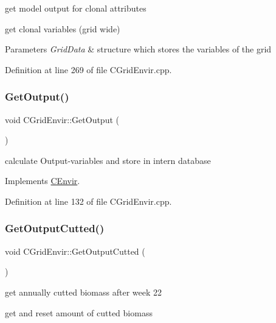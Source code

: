get model output for clonal attributes 

get clonal variables (grid wide) 
\begin{DoxyParams}{Parameters}
{\em Grid\+Data} & structure which stores the variables of the grid \\
\hline
\end{DoxyParams}


Definition at line 269 of file C\+Grid\+Envir.\+cpp.

\mbox{\label{class_c_grid_envir_ad14451529b1a3f9b7591f4d5b4e321c5}} 
\subsubsection{\texorpdfstring{GetOutput()}{GetOutput()}}
{\footnotesize\ttfamily void C\+Grid\+Envir\+::\+Get\+Output (\begin{DoxyParamCaption}{ }\end{DoxyParamCaption})\hspace{0.3cm}{\ttfamily [virtual]}}

calculate Output-\/variables and store in intern \textquotesingle{}database\textquotesingle{} 

Implements \mbox{\hyperlink{class_c_envir_a0327292c6ae32487c4fdde023f4302d5}{C\+Envir}}.



Definition at line 132 of file C\+Grid\+Envir.\+cpp.

\mbox{\label{class_c_grid_envir_abc5ce523f3821da0a39e1eefa6068946}} 
\subsubsection{\texorpdfstring{GetOutputCutted()}{GetOutputCutted()}}
{\footnotesize\ttfamily void C\+Grid\+Envir\+::\+Get\+Output\+Cutted (\begin{DoxyParamCaption}{ }\end{DoxyParamCaption})}



get annually cutted biomass after week 22 

get and reset amount of cutted biomass

